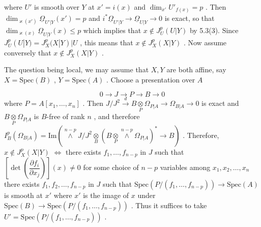 
where $U'$ is smooth over $Y$ at $x' = i(x)$ and $\dim_{x'}U'_{f(x)} = p$ . Then $\dim_{\varkappa(x')}\underline{\Omega}_{U'|Y}(x') = p$ and $i^{*}\underline{\Omega}_{U'|Y} \to \underline{\Omega}_{U|Y} \to 0$ is exact, so that $\dim_{\varkappa(x)}\underline{\Omega}_{U|Y}(x) \leq p$ which implies that $x \notin J^{p}_{U}(U|Y)$ by 5.3(3). Since $J^{p}_{U}(U|Y) = J^{p}_{X}(X|Y)|U$ , this means that $x \notin J^{p}_{X}(X|Y)$ . Now assume conversely that $x \notin J^{p}_{X}(X|Y)$ .

The question being local, we may assume that $X, Y$ are both affine, say $X = \mathrm{Spec}(B)$ , $Y = \mathrm{Spec}(A)$ . Choose a presentation over $A$

\begin{equation*}
0 \to J \to P \to B \to 0
\end{equation*}
where $P = A[x_1,\ldots,x_n]$ . Then $J/J^{2} \overset{d}{\to} B \underset{P}{\otimes} \Omega_{P|A} \to \Omega_{B|A} \to 0$ is exact and $B \underset{P}{\otimes} \Omega_{P|A}$ is $B$-free of rank $n$ , and therefore $I^{p}_{B}(\Omega_{B|A}) = \mathrm{Im}(\overset{n-p}{\wedge}J/J^{2} \underset{B}{\otimes} (B \underset{P}{\otimes} \overset{n-p}{\wedge}\Omega_{P|A})^{*} \to B)$ . Therefore, $x \notin J^{p}_{X}(X|Y)$ $\Leftrightarrow$ there exists $f_1,\ldots,f_{n-p}$ in $J$ such that $\left[\det\left(\dfrac{\partial f_i}{\partial x_j}\right)\right](x) \neq 0$ for some choice of $n-p$ variables among $x_1, x_2,\ldots,x_n$   there exists $f_1, f_2,\ldots,f_{n-p}$ in $J$ such that $\mathrm{Spec}(P/(f_1,\ldots,f_{n-p})) \to \mathrm{Spec}(A)$ is smooth at $x'$ where $x'$ is the image of $x$ under $\mathrm{Spec}(B) \to \mathrm{Spec}(P/(f_1,\ldots,f_{n-p}))$ . Thus it suffices to take $U' = \mathrm{Spec}(P/(f_1,\ldots,f_{n-p}))$ .

